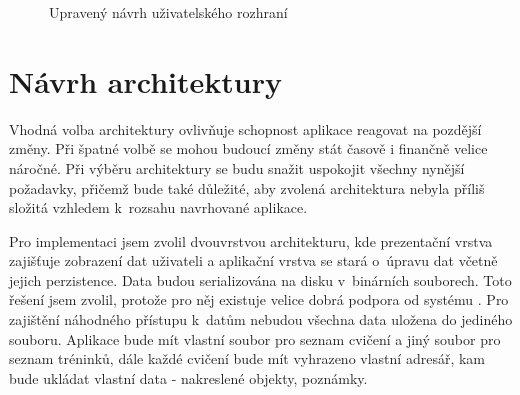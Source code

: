 \documentclass[thesis=B,czech]{FITthesis}[2012/06/26]
\begin{document}
	\begin{figure}[h!t]
		\centering
 		\hfil

 		\caption{Upravený návrh uživatelského rozhraní}
 		\label{pic:wireframes2}
	\end{figure}

\section{Návrh architektury}

	Vhodná volba architektury ovlivňuje schopnost aplikace reagovat na pozdější změny. Při špatné volbě se mohou budoucí změny stát časově i finančně velice náročné. Při výběru architektury se budu snažit uspokojit všechny nynější požadavky, přičemž bude také důležité, aby zvolená architektura nebyla příliš složitá vzhledem k~rozsahu navrhované aplikace.

	Pro implementaci jsem zvolil dvouvrstvou architekturu, kde prezentační vrstva zajišťuje zobrazení dat uživateli a aplikační vrstva se stará o~úpravu dat včetně jejich perzistence. Data budou serializována na disku v~binárních souborech. Toto řešení jsem zvolil, protože pro něj existuje velice dobrá podpora od systému \cite{nsCodingOnline}. Pro zajištění náhodného přístupu k~datům nebudou všechna data uložena do jediného souboru. Aplikace bude mít vlastní soubor pro seznam cvičení a jiný soubor pro seznam tréninků, dále každé cvičení bude mít vyhrazeno vlastní adresář, kam bude ukládat vlastní data \-- nakreslené objekty, poznámky.
\end{document}
